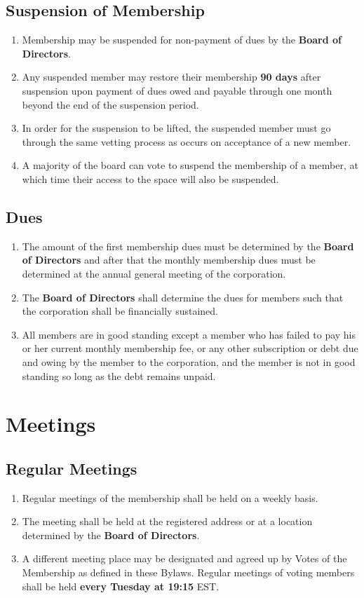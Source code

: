 \documentclass{article}
\begin{document}
\subsection{Suspension of Membership}
\begin{enumerate}
    \item Membership may be suspended for non-payment of dues by the
    \textbf{Board of Directors}.
    \item Any suspended member may restore their membership \textbf{90 days}
    after suspension upon payment of dues owed and payable through one month
    beyond the end of the suspension period.
    \item In order for the suspension to be lifted, the suspended member must go
    through the same vetting process as occurs on acceptance of a new member.
    \item A majority of the board can vote to suspend the membership of a member,
    at which time their access to the space will also be suspended.
\end{enumerate}
\subsection{Dues}
\begin{enumerate}
    \item The amount of the first membership dues must be determined by the
    \textbf{Board of Directors} and after that the monthly membership dues must
    be determined at the annual general meeting of the corporation.
    \item The \textbf{Board of Directors} shall determine the dues for members
    such that the corporation shall be financially sustained.
    \item All members are in good standing except a member who has failed to pay
    his or her current monthly membership fee, or any other subscription or debt
    due and owing by the member to the corporation, and the member is not in
    good standing so long as the debt remains unpaid.
\end{enumerate}
\section{Meetings}
\subsection{Regular Meetings}
\begin{enumerate}
    \item Regular meetings of the membership shall be held on a weekly basis.
    \item The meeting shall be held at the registered address or at a location
    determined by the \textbf{Board of Directors}.
    \item A different meeting place may be designated and agreed up by Votes of
    the Membership as defined in these Bylaws. Regular meetings of voting members
    shall be held \textbf{every Tuesday at 19:15} EST.
\end{enumerate}
\end{document}
